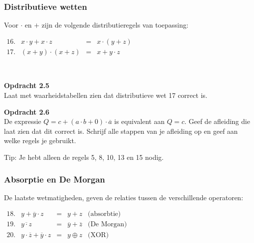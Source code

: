 \documentclass[11pt,a5paper]{report}
\begin{document}
\subsubsection*{Distributieve wetten}
\begin{minipage}[t]{0.45\textwidth}
Voor $\cdot$ en $+$ zijn de volgende distributieregels van toepassing:
\end{minipage}%
\hfill
\begin{minipage}[t]{0.53\textwidth}
\vspace*{-1em}
\(
\begin{array}{lccc}
16. & x \cdot y + x \cdot z &=& x \cdot (y + z) \\
17. & (x + y) \cdot (x + z) &=& x + y \cdot z 
\end{array}
\)
\end{minipage}\\


\begin{framed}
\textbf{Opdracht 2.5}\\
Laat met waarheidstabellen zien dat distributieve wet 17 correct is.
\end{framed}

\begin{framed}
\textbf{Opdracht 2.6}\\
De expressie $Q = c + (a \cdot b + 0) \cdot \overline{a}$ is equivalent aan $Q = c$. Geef de afleiding die laat zien dat dit correct is. Schrijf alle stappen van je afleiding op en geef aan welke regels je gebruikt. 

Tip: Je hebt alleen de regels 5, 8, 10, 13 en 15 nodig.
\end{framed}

\subsubsection*{Absorptie en De Morgan}


\begin{minipage}[t]{0.45\textwidth}
De laatste wetmatigheden, geven de relaties tussen de verschillende operatoren:
\end{minipage}%
\hfill
\begin{minipage}[t]{0.53\textwidth}
\vspace*{-1em}
\(
\begin{array}{lcccl}
18. & y + \overline{y} \cdot z &=& y + z &\text{(absorbtie)}\\
19. & \overline{y \cdot z} &=& \overline{y} + \overline{z} &\text{(De Morgan)} \\
20. & y \cdot \overline{z} + \overline{y} \cdot{z} & = & y \oplus z & \text{(XOR)}
\end{array}
\)
\end{minipage}\\
\end{document}

